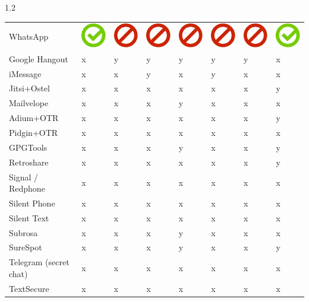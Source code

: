 \documentclass[final]{beamer}
\newlength{\twocolwid}
\begin{document}
\begin{frame}[t]
\begin{columns}[t, totalwidth=\textwidth]
\begin{column}{1.2\twocolwid}
\begin{tabular}{ L{8cm} | C{4.5cm} | C{4.5cm} | C{4.5cm} | C{4.5cm} | C{4.5cm} | C{5cm} | C{4.5cm} | }
WhatsApp & \includegraphics[scale=0.5]{pics/haken.png} & \includegraphics[scale=0.5]{pics/nohaken.png} & \includegraphics[scale=0.5]{pics/nohaken.png} & \includegraphics[scale=0.5]{pics/nohaken.png} & \includegraphics[scale=0.5]{pics/nohaken.png} & \includegraphics[scale=0.5]{pics/nohaken.png} & \includegraphics[scale=0.5]{pics/haken.png} \tabularnewline
Google Hangout & x & y & y & y & y & y & x \tabularnewline
iMessage & x & x & y & x & y & x & x \tabularnewline
Jitsi+Ostel  & x & x & x & x & x & x & y \tabularnewline
Mailvelope   & x & x & x & y & x & x & x \tabularnewline
Adium+OTR & x & x & x & x & x & x & y \tabularnewline
Pidgin+OTR & x & x & x & x & x & x & x \tabularnewline
GPGTools & x & x & x & y & x & x & y \tabularnewline
Retroshare & x & x & x & x & x & x & y \tabularnewline
Signal / Redphone & x & x & x & x & x & x & x \tabularnewline
Silent Phone & x & x & x & x & x & x & x \tabularnewline
Silent Text & x & x & x & x & x & x & x \tabularnewline
Subrosa & x & x & x & y & x & x & x \tabularnewline
SureSpot & x & x & x & y & x & x & y \tabularnewline
Telegram (secret chat) & x & x & x & x & x & x & x \tabularnewline
TextSecure & x & x & x & x & x & x & x \tabularnewline
\hline
\end{tabular}


\end{column}
\end{columns}
\end{frame}
\end{document}
